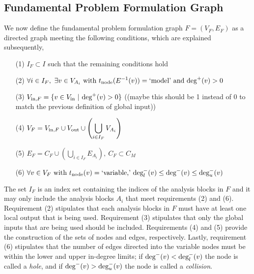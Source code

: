 \subsection{Fundamental Problem Formulation Graph}
We now define the fundamental problem formulation graph $F=(V_F,E_F)$ as a directed graph meeting the following conditions, which are explained subsequently,
\begin{enumerate}
\item[(1)] $\displaystyle{I_F \subset I}$ such that the remaining conditions hold
\item[(2)] $\displaystyle{ \forall i \in I_F, \ \exists v \in V_{A_i} \textrm{ with } t_\textrm{node}(E^{-1}(v))=\textrm{`model'} \textrm{ and } \textrm{deg}^+(v)>0 }$
\item[(3)] $\displaystyle{V_{\textrm{in},F} = \{v \in V_\textrm{in}  \ | \ \textrm{deg}^+(v) > 0\} }$ ((maybe this should be 1 instead of 0 to match the previous definition of global input))
\item[(4)] $\displaystyle{V_F = V_{\textrm{in},F} \cup V_\textrm{out} \cup \left( \bigcup_{i \in I_F} V_{A_i} \right)}$
\item[(5)] $\displaystyle{E_F = C_F \cup \left( \bigcup_{i \in I_F} E_{A_i} \right), \ C_F \subset C_M}$
\item[(6)] $\displaystyle{\forall v \in V_F \textrm{ with } t_\textrm{node}(v) = \textrm{`variable,'} \  \textrm{deg}_l^-(v) \leq \textrm{deg}^-(v) \leq \textrm{deg}_u^-(v)}$
\end{enumerate}
The set $I_F$ is an index set containing the indices of the analysis blocks in $F$ and it may only include the analysis blocks $A_i$ that meet requirements (2) and (6). 
Requirement (2) stipulates that each analysis blocks in $F$ must have at least one local output that is being used. 
Requirement (3) stipulates that only the global inputs that are being used should be included. 
Requirements (4) and (5) provide the construction of the sets of nodes and edges, respectively. 
Lastly, requirement (6) stipulates that the number of edges directed into the variable nodes must be within the lower and upper in-degree limits; if $\textrm{deg}^-(v) < \textrm{deg}_l^-(v)$ the node is called a \emph{hole}, and if $\textrm{deg}^-(v) > \textrm{deg}_u^-(v)$ the node is called a \emph{collision}. 

